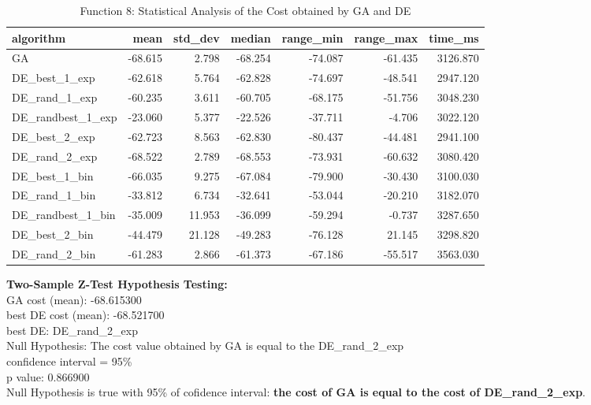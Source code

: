 \documentclass[12pt]{article}
\begin{document}
\begin{table}[H]
    \centering
    \footnotesize
    \begin{tabular}{lrrrrrr}
        \toprule
        algorithm &    mean &  std\_dev &  median &  range\_min &  range\_max &  time\_ms \\
        \midrule
        GA & -68.615 &    2.798 & -68.254 &    -74.087 &    -61.435 & 3126.870 \\
        DE\_best\_1\_exp & -62.618 &    5.764 & -62.828 &    -74.697 &    -48.541 & 2947.120 \\
        DE\_rand\_1\_exp & -60.235 &    3.611 & -60.705 &    -68.175 &    -51.756 & 3048.230 \\
        DE\_randbest\_1\_exp & -23.060 &    5.377 & -22.526 &    -37.711 &     -4.706 & 3022.120 \\
        DE\_best\_2\_exp & -62.723 &    8.563 & -62.830 &    -80.437 &    -44.481 & 2941.100 \\
        DE\_rand\_2\_exp & -68.522 &    2.789 & -68.553 &    -73.931 &    -60.632 & 3080.420 \\
        DE\_best\_1\_bin & -66.035 &    9.275 & -67.084 &    -79.900 &    -30.430 & 3100.030 \\
        DE\_rand\_1\_bin & -33.812 &    6.734 & -32.641 &    -53.044 &    -20.210 & 3182.070 \\
        DE\_randbest\_1\_bin & -35.009 &   11.953 & -36.099 &    -59.294 &     -0.737 & 3287.650 \\
        DE\_best\_2\_bin & -44.479 &   21.128 & -49.283 &    -76.128 &     21.145 & 3298.820 \\
        DE\_rand\_2\_bin & -61.283 &    2.866 & -61.373 &    -67.186 &    -55.517 & 3563.030 \\
        \bottomrule
    \end{tabular}
    
    \caption{Function 8: Statistical Analysis of the Cost obtained by GA and DE} 
\end{table}


\noindent
\textbf{Two-Sample Z-Test Hypothesis Testing:}\\
GA cost (mean): -68.615300\\
best DE cost (mean): -68.521700\\
best DE: DE\_rand\_2\_exp\\
Null Hypothesis: The cost value obtained by GA is equal to the DE\_rand\_2\_exp\\
confidence interval = 95\%\\
p value: 0.866900\\
Null Hypothesis is true with 95\% of cofidence interval: \textbf{the cost of GA is equal to the cost of DE\_rand\_2\_exp}.\\
\end{document}
